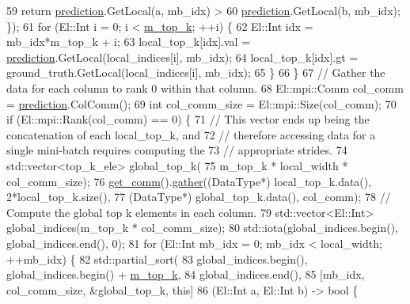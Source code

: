\begin{DoxyCode}
59           \textcolor{keywordflow}{return} \hyperlink{base_8hpp_a2781a159088df64ed7d47cc91c4dc0a8ac41b9ec75e920b610e8907e066074b30}{prediction}.GetLocal(a, mb\_idx) >
60             \hyperlink{base_8hpp_a2781a159088df64ed7d47cc91c4dc0a8ac41b9ec75e920b610e8907e066074b30}{prediction}.GetLocal(b, mb\_idx); \});
61       \textcolor{keywordflow}{for} (El::Int i = 0; i < \hyperlink{classlbann_1_1top__k__categorical__accuracy__metric_a6cc172f6799bffac44de06d0657efdeb}{m\_top\_k}; ++i) \{
62         El::Int idx = mb\_idx*m\_top\_k + i;
63         local\_top\_k[idx].val = \hyperlink{base_8hpp_a2781a159088df64ed7d47cc91c4dc0a8ac41b9ec75e920b610e8907e066074b30}{prediction}.GetLocal(local\_indices[i], mb\_idx);
64         local\_top\_k[idx].gt = ground\_truth.GetLocal(local\_indices[i], mb\_idx);
65       \}
66     \}
67     \textcolor{comment}{// Gather the data for each column to rank 0 within that column.}
68     El::mpi::Comm col\_comm = \hyperlink{base_8hpp_a2781a159088df64ed7d47cc91c4dc0a8ac41b9ec75e920b610e8907e066074b30}{prediction}.ColComm();
69     \textcolor{keywordtype}{int} col\_comm\_size = El::mpi::Size(col\_comm);
70     \textcolor{keywordflow}{if} (El::mpi::Rank(col\_comm) == 0) \{
71       \textcolor{comment}{// This vector ends up being the concatenation of each local\_top\_k, and}
72       \textcolor{comment}{// therefore accessing data for a single mini-batch requires computing the}
73       \textcolor{comment}{// appropriate strides.}
74       std::vector<top\_k\_ele> global\_top\_k(
75         m\_top\_k * local\_width * col\_comm\_size);
76       \hyperlink{classlbann_1_1metric_a464120720df6bfdf91bffe353e562964}{get\_comm}().\hyperlink{classlbann_1_1lbann__comm_aa784298e6ed0f9f01a20b179d5110df9}{gather}((DataType*) local\_top\_k.data(), 2*local\_top\_k.size(),
77                         (DataType*) global\_top\_k.data(), col\_comm);
78       \textcolor{comment}{// Compute the global top k elements in each column.}
79       std::vector<El::Int> global\_indices(m\_top\_k * col\_comm\_size);
80       std::iota(global\_indices.begin(), global\_indices.end(), 0);
81       \textcolor{keywordflow}{for} (El::Int mb\_idx = 0; mb\_idx < local\_width; ++mb\_idx) \{
82         std::partial\_sort(
83           global\_indices.begin(), global\_indices.begin() + \hyperlink{classlbann_1_1top__k__categorical__accuracy__metric_a6cc172f6799bffac44de06d0657efdeb}{m\_top\_k},
84           global\_indices.end(),
85           [mb\_idx, col\_comm\_size, &global\_top\_k, \textcolor{keyword}{this}]
86           (El::Int a, El::Int b) -> \textcolor{keywordtype}{bool} \{

\end{DoxyCode}
